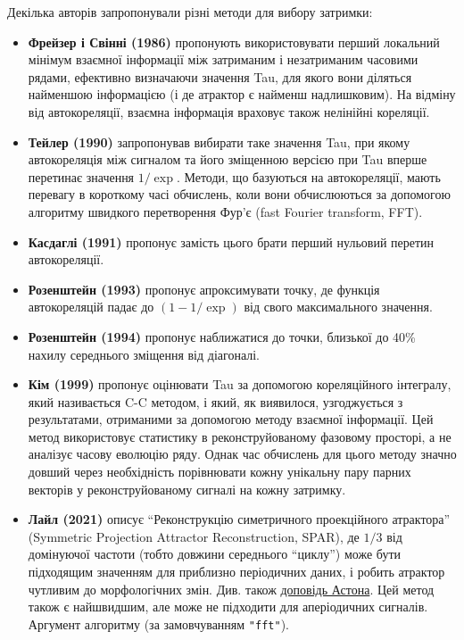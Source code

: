 \documentclass[
  letterpaper,
]{report}
\providecommand{\tightlist}{%
  \setlength{\itemsep}{0pt}\setlength{\parskip}{0pt}}\usepackage{longtable,booktabs,array}
\begin{document}
Декілька авторів запропонували різні методи для вибору затримки:

\begin{itemize}
\tightlist
\item
  \textbf{Фрейзер і Свінні (1986)} пропонують використовувати перший
  локальний мінімум взаємної інформації між затриманим і незатриманим
  часовими рядами, ефективно визначаючи значення Tau, для якого вони
  діляться найменшою інформацією (і де атрактор є найменш надлишковим).
  На відміну від автокореляції, взаємна інформація враховує також
  нелінійні кореляції.
\item
  \textbf{Тейлер (1990)} запропонував вибирати таке значення Tau, при
  якому автокореляція між сигналом та його зміщенною версією при Tau
  вперше перетинає значення \(1/\exp\). Методи, що базуються на
  автокореляції, мають перевагу в короткому часі обчислень, коли вони
  обчислюються за допомогою алгоритму швидкого перетворення Фур'є (fast
  Fourier transform, FFT).
\item
  \textbf{Касдаглі (1991)} пропонує замість цього брати перший нульовий
  перетин автокореляції.
\item
  \textbf{Розенштейн (1993)} пропонує апроксимувати точку, де функція
  автокореляцій падає до \(\left( 1-1/\exp \right)\) від свого
  максимального значення.
\item
  \textbf{Розенштейн (1994)} пропонує наближатися до точки, близької до
  40\% нахилу середнього зміщення від діагоналі.
\item
  \textbf{Кім (1999)} пропонує оцінювати Tau за допомогою кореляційного
  інтегралу, який називається C-C методом, і який, як виявилося,
  узгоджується з результатами, отриманими за допомогою методу взаємної
  інформації. Цей метод використовує статистику в реконструйованому
  фазовому просторі, а не аналізує часову еволюцію ряду. Однак час
  обчислень для цього методу значно довший через необхідність
  порівнювати кожну унікальну пару парних векторів у реконструйованому
  сигналі на кожну затримку.
\item
  \textbf{Лайл (2021)} описує ``Реконструкцію симетричного проекційного
  атрактора'' (Symmetric Projection Attractor Reconstruction, SPAR), де
  \(1/3\) від домінуючої частоти (тобто довжини середнього ``циклу'')
  може бути підходящим значенням для приблизно періодичних даних, і
  робить атрактор чутливим до морфологічних змін. Див. також
  \href{https://youtu.be/GGrOJtcTcHA?t=730}{доповідь Астона}. Цей метод
  також є найшвидшим, але може не підходити для аперіодичних сигналів.
  Аргумент алгоритму (за замовчуванням \texttt{"fft"}).
\end{itemize}
\end{document}
